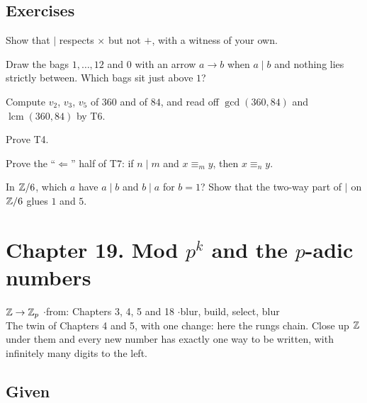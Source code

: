 \subsection*{Exercises}

\begin{lines}
\item[\lab{E1}] Show that $\mid$ respects $\times$ but not $+$, with a witness of your own.
\item[\lab{E2}] Draw the bags $1, \dots, 12$ and $0$ with an arrow $a \to b$ when $a \mid b$ and nothing lies strictly between. Which bags sit just above $1$?
\item[\lab{E3}] Compute $v_2$, $v_3$, $v_5$ of $360$ and of $84$, and read off $\gcd(360, 84)$ and $\operatorname{lcm}(360, 84)$ by T6.
\item[\lab{E4}] Prove T4.
\item[\lab{E5}] Prove the ``$\Leftarrow$'' half of T7: if $n \mid m$ and $x \equiv_m y$, then $x \equiv_n y$.
\item[\lab{E6}] In $\mathbb{Z}/6$, which $a$ have $a \mid b$ and $b \mid a$ for $b = 1$? Show that the two-way part of $\mid$ on $\mathbb{Z}/6$ glues $1$ and $5$.
\end{lines}

\newpage

\section*{Chapter 19. Mod $p^k$ and the $p$-adic numbers}
\begin{center}
{\normalsize $\mathbb{Z} \to \mathbb{Z}_p$ \quad$\cdot$\quad from: Chapters 3, 4, 5 and 18 \quad$\cdot$\quad blur, build, select, blur}\\[4pt]
{\small The twin of Chapters 4 and 5, with one change: here the rungs chain. Close up $\mathbb{Z}$ under them and every new number has exactly one way to be written, with infinitely many digits to the left.}
\end{center}

\subsection*{Given}

